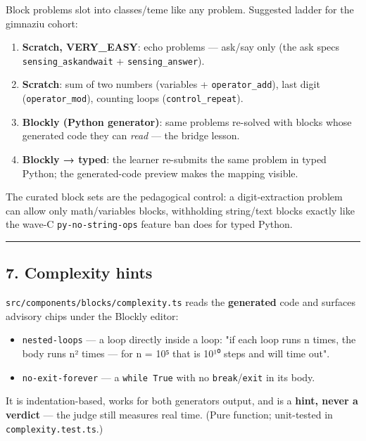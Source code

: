 \documentclass[
]{article}
\providecommand{\tightlist}{%
  \setlength{\itemsep}{0pt}\setlength{\parskip}{0pt}}
\begin{document}
Block problems slot into classes/teme like any problem. Suggested ladder
for the gimnaziu cohort:

\begin{enumerate}
\def\labelenumi{\arabic{enumi}.}
\tightlist
\item
  \textbf{Scratch, VERY\_EASY}: echo problems --- ask/say only (the ask
  spec\textquotesingle s \texttt{sensing\_askandwait} +
  \texttt{sensing\_answer}).
\item
  \textbf{Scratch}: sum of two numbers (variables +
  \texttt{operator\_add}), last digit (\texttt{operator\_mod}), counting
  loops (\texttt{control\_repeat}).
\item
  \textbf{Blockly (Python generator)}: same problems re-solved with
  blocks whose generated code they can \emph{read} --- the bridge
  lesson.
\item
  \textbf{Blockly → typed}: the learner re-submits the same problem in
  typed Python; the generated-code preview makes the mapping visible.
\end{enumerate}

The curated block sets are the pedagogical control: a digit-extraction
problem can allow only math/variables blocks, withholding string/text
blocks exactly like the wave-C \texttt{py-no-string-ops} feature ban
does for typed Python.

\begin{center}\rule{0.5\linewidth}{0.5pt}\end{center}

\subsection{7. Complexity hints}\label{7-complexity-hints}

\texttt{src/components/blocks/complexity.ts} reads the
\textbf{generated} code and surfaces advisory chips under the Blockly
editor:

\begin{itemize}
\tightlist
\item
  \texttt{nested-loops} --- a loop directly inside a loop: "if each loop
  runs n times, the body runs n² times --- for n = 10⁵ that is 10¹⁰
  steps and will time out".
\item
  \texttt{no-exit-forever} --- a \texttt{while\ True} with no
  \texttt{break}/\texttt{exit} in its body.
\end{itemize}

It is indentation-based, works for both generators\textquotesingle{}
output, and is a \textbf{hint, never a verdict} --- the judge still
measures real time. (Pure function; unit-tested in
\texttt{complexity.test.ts}.)
\end{document}
